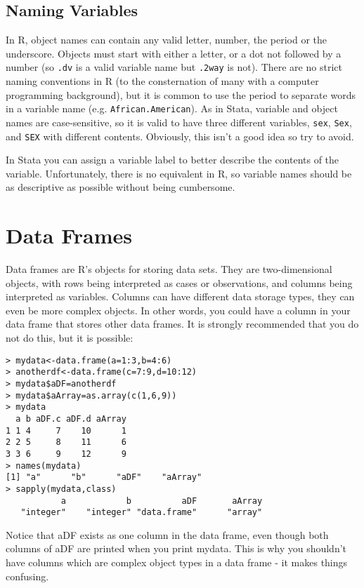 \documentclass[12pt, oneside]{amsart}   	%
\begin{document}
\subsection{Naming Variables}

In R, object names can contain any valid letter, number, the period or the underscore. Objects must start with either a letter, or a dot not followed by a number (so \texttt{.dv} is a valid variable name but \texttt{.2way} is not). There are no strict naming conventions in R (to the consternation of many with a computer programming background), but it is common to use the period to separate words in a variable name (e.g. \texttt{African.American}). As in Stata, variable and object names are case-sensitive, so it is valid to have three different variables, \texttt{sex}, \texttt{Sex}, and \texttt{SEX} with different contents. Obviously, this isn't a good idea so try to avoid. 

In Stata you can assign a variable label to better describe the contents of the variable. Unfortunately, there is no equivalent in R, so variable names should be as descriptive as possible without being cumbersome. 

\section{Data Frames}

Data frames are R's objects for storing data sets. They are two-dimensional objects, with rows being interpreted as cases or observations, and columns being interpreted as variables. Columns can have different data storage types, they can even be more complex objects. In other words, you could have a column in your data frame that stores other data frames. It is strongly recommended that you do not do this, but it is possible:

\begin{verbatim}
> mydata<-data.frame(a=1:3,b=4:6)
> anotherdf<-data.frame(c=7:9,d=10:12)
> mydata$aDF=anotherdf
> mydata$aArray=as.array(c(1,6,9))
> mydata
  a b aDF.c aDF.d aArray
1 1 4     7    10      1
2 2 5     8    11      6
3 3 6     9    12      9
> names(mydata)
[1] "a"      "b"      "aDF"    "aArray"
> sapply(mydata,class)
           a            b          aDF       aArray 
   "integer"    "integer" "data.frame"      "array" 
\end{verbatim}  

Notice that aDF exists as one column in the data frame, even though both columns of aDF are printed when you print mydata. This is why you shouldn't have columns which are complex object types in a data frame - it makes things confusing.
\end{document}
